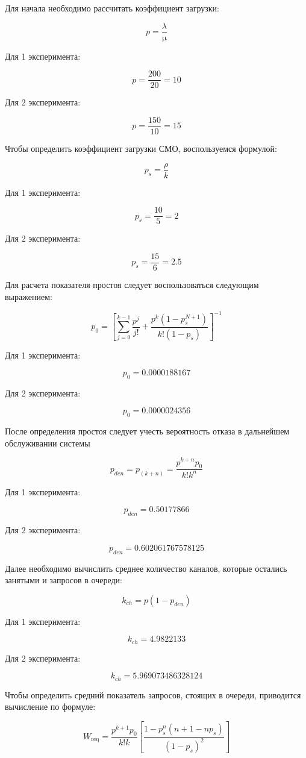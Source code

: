 Для начала необходимо рассчитать коэффициент загрузки:

$$p = \frac{\lambda}{\upmu}$$

Для 1 эксперимента:

$$p = \frac{200}{20} = 10$$

Для 2 эксперимента:

$$p = \frac{150}{10} = 15$$

Чтобы определить коэффициент загрузки СМО, воспользуемся формулой:

$$p_s = \frac{\rho}{k}$$

Для 1 эксперимента:

$$p_s = \frac{10}{5} = 2$$

Для 2 эксперимента:

$$p_s = \frac{15}{6} = 2.5$$

Для расчета показателя простоя следует воспользоваться следующим
выражением:

$$p_0 = \left[ \sum_{j=0}^{k-1} \frac{p^j}{j!} + \frac{p^k \left(1 - p_s^{N+1}\right)}{k! \left(1 - p_s\right)} \right]^{-1}$$

Для 1 эксперимента:

$$p_0 = 0.0000188167$$

Для 2 эксперимента:

$$p_0 = 0.0000024356$$

После определения простоя следует учесть вероятность отказа в
дальнейшем обслуживании системы

$$p_{den} = p_{(k+n)} = \frac{p^{k+n}p_0}{k!k^n}$$

Для 1 эксперимента:

$$p_{den} = 0.50177866$$

Для 2 эксперимента:

$$p_{den} = 0.602061767578125$$

Далее необходимо вычислить среднее количество каналов, которые
остались занятыми и запросов в очереди:

$$k_{ch} = p(1 - p_{den})$$

Для 1 эксперимента:

$$k_{ch} = 4.9822133$$

Для 2 эксперимента:

$$k_{ch} = 5.969073486328124$$

Чтобы определить средний показатель запросов, стоящих в очереди,
приводится вычисление по формуле:

$$W_{\text{req}} = \frac{p^{k+1} p_0}{k!k} \left[ \frac{1 - p_s^n (n + 1 - n p_s)}{(1 - p_s)^2} \right]$$

